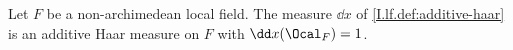 Let $F$ be a non-archimedean local field. The measure $\dd x$ of \cref{I.lf.def:additive-haar} is an additive Haar measure on $F$ with $\dd x(\Ocal_F)=1$.
